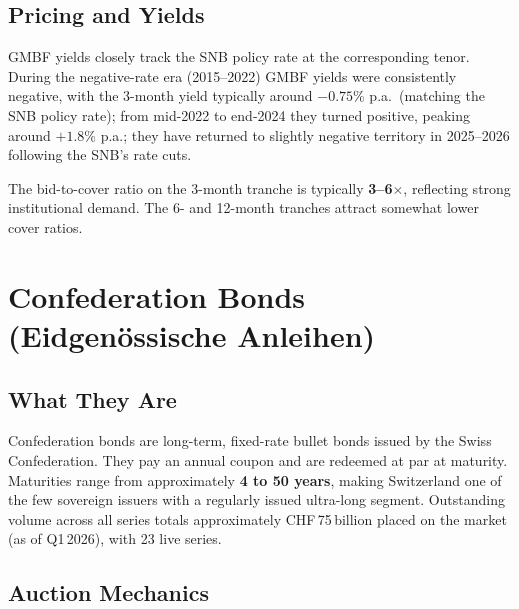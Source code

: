 \documentclass[12pt,a4paper]{article}
\begin{document}
\subsection{Pricing and Yields}

GMBF yields closely track the SNB policy rate at the corresponding tenor.
During the negative-rate era (2015--2022) GMBF yields were consistently
negative, with the 3-month yield typically around $-0.75$\% p.a.\
(matching the SNB policy rate); from mid-2022 to end-2024 they turned
positive, peaking around $+1.8$\% p.a.; they have returned to slightly
negative territory in 2025--2026 following the SNB's rate cuts.

The bid-to-cover ratio on the 3-month tranche is typically \textbf{3--6$\times$},
reflecting strong institutional demand.  The 6- and 12-month tranches
attract somewhat lower cover ratios.

\section{Confederation Bonds (Eidgenössische Anleihen)}

\subsection{What They Are}

Confederation bonds are long-term, fixed-rate bullet bonds issued by the
Swiss Confederation.  They pay an annual coupon and are redeemed at par at
maturity.  Maturities range from approximately \textbf{4 to 50 years}, making
Switzerland one of the few sovereign issuers with a regularly issued
ultra-long segment.  Outstanding volume across all series totals approximately
CHF\,75\,billion placed on the market (as of Q1\,2026), with 23 live series.

\subsection{Auction Mechanics}
\end{document}
